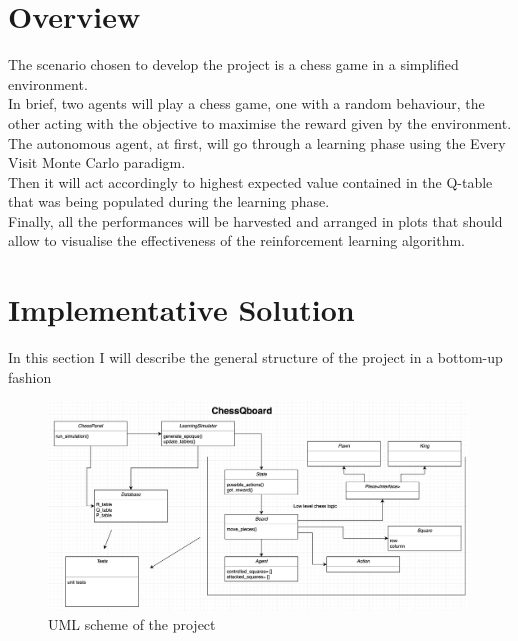 \documentclass{article}
\begin{document}
				\section{Overview}
				The scenario chosen to develop the project is a chess game in a simplified environment.\medskip\\
				In brief, two agents will play a chess game, one with a random behaviour, the other acting with the objective to maximise the reward given by the environment.\medskip\\
				The autonomous agent, at first, will go through a learning phase using the Every Visit Monte Carlo paradigm.\medskip\\
				Then it will act accordingly to highest expected value contained in the Q-table that was being populated during the learning phase.\medskip\\
				Finally, all the performances will be harvested and arranged in plots that should allow to visualise the effectiveness of the reinforcement learning algorithm.
				\newpage
				\section{Implementative Solution }
				In this section I will describe the general structure of the project in a bottom-up fashion\medskip\\ 
\begin{center}
\begin{figure}[h]
\centering
\includegraphics[width=0.99\textwidth]{uml_chess}
\caption{UML scheme of the project}
\label{fig:2}
\end{figure}
\end{center}
\end{document}
